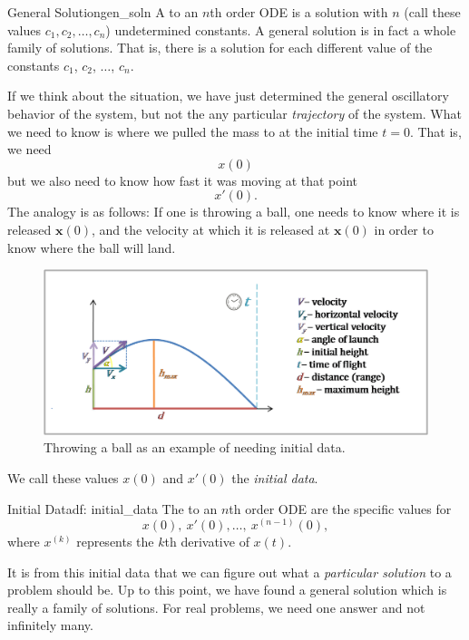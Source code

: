         \begin{df}{General Solution}{gen_soln}
            A  to an $n$th order ODE is a solution with $n$  (call these values $c_1,c_2,\dots,c_n$) undetermined constants. A general solution is in fact a whole family of solutions. That is, there is a solution for each different value of the constants $c_1$, $c_2$, $\dots$, $c_n$.
        \end{df}
        
        If we think about the situation, we have just determined the general oscillatory behavior of the system, but not the any particular \emph{trajectory} of the system. What we need to know is where we pulled the mass to at the initial time $t=0$. That is, we need
        \[
        x(0)
        \]
        but we also need to know how fast it was moving at that point 
        \[
        x'(0).
        \]
        The analogy is as follows: If one is throwing a ball, one needs to know where it is released $\mathbf{x}(0)$, and the velocity at which it is released at $\mathbf{x}(0)$ in order to know where the ball will land.
        \begin{figure}[H]
            \centering
            \includegraphics[width=.7\textwidth]{Figures/projectile-motion.png}
            \caption{Throwing a ball as an example of needing initial data.}
            \label{fig:proj_motion}
        \end{figure}
        \noindent We call these values $x(0)$ and $x'(0)$ the \emph{initial data}. 
        
        \begin{df}{Initial Data}{df: initial_data}
            The   to an $n$th order ODE are the specific values for
            \[
            x(0),~ x'(0),\dots,~ x^{(n-1)}(0),
            \]
            where $x^{(k)}$ represents the $k$th derivative of $x(t)$.
        \end{df}
        
        \noindent It is from this initial data that we can figure out what a \emph{particular solution} to a problem should be.  Up to this point, we have found a general solution which is really a family of solutions. For real problems, we need one answer and not infinitely many.  
        
